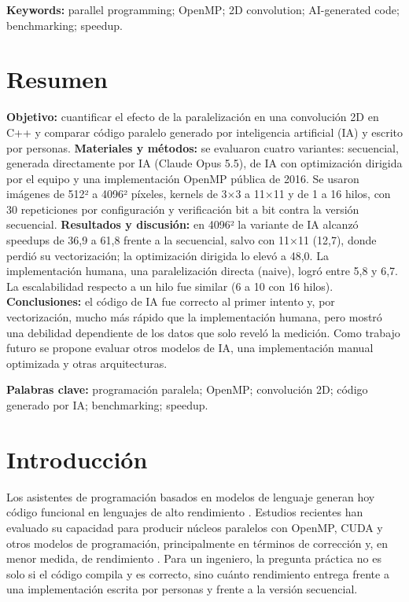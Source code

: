\documentclass[12pt]{article}
\begin{document}
\textbf{Keywords:} parallel programming; OpenMP; 2D convolution; AI-generated code; benchmarking; speedup.

\section*{Resumen}
\textbf{Objetivo:} cuantificar el efecto de la paralelización en una convolución 2D en C++ y comparar código paralelo generado por inteligencia artificial (IA) y escrito por personas.
\textbf{Materiales y métodos:} se evaluaron cuatro variantes: secuencial, generada directamente por IA (Claude Opus 5.5), de IA con optimización dirigida por el equipo y una implementación OpenMP pública de 2016. Se usaron imágenes de 512² a 4096² píxeles, kernels de 3×3 a 11×11 y de 1 a 16 hilos, con 30 repeticiones por configuración y verificación bit a bit contra la versión secuencial.
\textbf{Resultados y discusión:} en 4096² la variante de IA alcanzó speedups de 36,9 a 61,8 frente a la secuencial, salvo con 11×11 (12,7), donde perdió su vectorización; la optimización dirigida lo elevó a 48,0. La implementación humana, una paralelización directa (naive), logró entre 5,8 y 6,7. La escalabilidad respecto a un hilo fue similar (6 a 10 con 16 hilos).
\textbf{Conclusiones:} el código de IA fue correcto al primer intento y, por vectorización, mucho más rápido que la implementación humana, pero mostró una debilidad dependiente de los datos que solo reveló la medición. Como trabajo futuro se propone evaluar otros modelos de IA, una implementación manual optimizada y otras arquitecturas.

\textbf{Palabras clave:} programación paralela; OpenMP; convolución 2D; código generado por IA; benchmarking; speedup.

\section{Introducción}
Los asistentes de programación basados en modelos de lenguaje generan hoy código funcional en lenguajes de alto rendimiento \cite{chen2021codex}. Estudios recientes han evaluado su capacidad para producir núcleos paralelos con OpenMP, CUDA y otros modelos de programación, principalmente en términos de corrección y, en menor medida, de rendimiento \cite{godoy2023,nichols2024}. Para un ingeniero, la pregunta práctica no es solo si el código compila y es correcto, sino cuánto rendimiento entrega frente a una implementación escrita por personas y frente a la versión secuencial.
\end{document}
